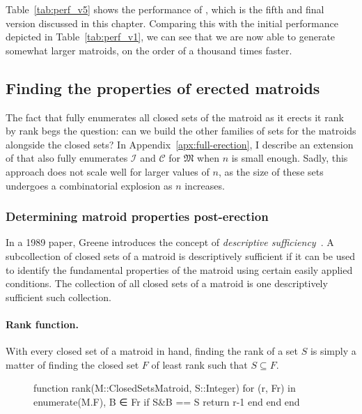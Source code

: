 Table~\ref{tab:perf_v5} shows the performance of , which is the fifth and final version discussed in this chapter. Comparing this with the initial performance depicted in Table~\ref{tab:perf_v1}, we can see that we are now able to generate somewhat larger matroids, on the order of a thousand times faster.

\subsection{Finding the properties of erected matroids}
The fact that  fully enumerates all closed sets of the matroid as it erects it rank by rank begs the question: can we build the other families of sets for the matroids alongside the closed sets? In Appendix~\ref{apx:full-erection}, I describe an extension of  that also fully enumerates $\mathcal{I}$ and $\mathcal{C}$ for $\mathfrak{M}$ when $n$ is small enough. Sadly, this approach does not scale well for larger values of $n$, as the size of these sets undergoes a combinatorial explosion as $n$ increases. 


\subsubsection{Determining matroid properties post-erection}
In a 1989 paper, Greene introduces the concept of \textit{descriptive sufficiency}~\cite{greene-1991}. A subcollection of closed sets of a matroid is descriptively sufficient if it can be used to identify the fundamental properties of the matroid using certain easily applied conditions. The collection of all closed sets of a matroid is one descriptively sufficient such collection. 

\paragraph{Rank function.} With every closed set of a matroid in hand, finding the rank of a set $S$ is simply a matter of finding the closed set $F$ of least rank such that $S\subseteq F$.

\begin{figure}[ht!]
\begin{jllisting}
function rank(M::ClosedSetsMatroid, S::Integer)
  for (r, Fr) in enumerate(M.F), B ∈ Fr
      if S&B == S return r-1 end
  end
end
\end{jllisting}
\end{figure}

